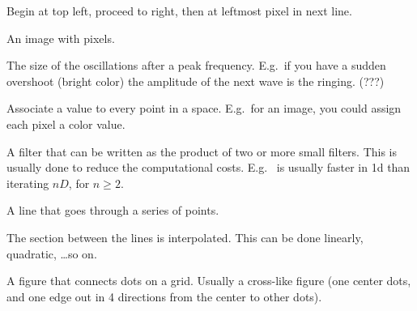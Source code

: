 \begin{definition}
    Begin at top left, proceed to right, then at leftmost pixel in next line.
\end{definition}

\begin{definition}
    An image with pixels.
\end{definition}

\begin{definition}[Ringing]
    The size of the oscillations after a peak frequency. E.g.\ if you have a 
    sudden overshoot (bright color) the amplitude of the next wave is
    the ringing. (???)
\end{definition}

\begin{definition}\label{scalarfield}
    Associate a value to every point in a space. E.g.\ for an image, you
    could assign each pixel a color value.
\end{definition}

\begin{definition}
    A filter that can be written as the product of two or more small filters.
    This is usually done to reduce the computational costs.
    E.g.~ is usually faster in 1d than iterating $nD$, for
    $n \ge 2$.
\end{definition}

\begin{definition}[Spline]
    A line that goes through a series of points.

    The section between the lines is interpolated. This can be done linearly,
    quadratic, \dots so on.
\end{definition}

\begin{definition}[Stencil]
    A figure that connects dots on a grid. Usually a cross-like figure 
    (one center dots, and one edge out in 4 directions from the center to
    other dots).
\end{definition}
